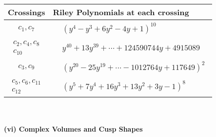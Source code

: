 \documentclass[1p]{elsarticle_modified}
\theoremstyle{definition}
\begin{document}
\begin{tabular}{m{50pt}|m{274pt}}
Crossings & \hspace{64pt}Riley Polynomials at each crossing \\
\hline $$\begin{aligned}c_{1},c_{7}\end{aligned}$$&$\begin{aligned}
&(y^4- y^3+6 y^2-4 y+1)^{10}
\end{aligned}$\\
\hline $$\begin{aligned}c_{2},c_{4},c_{8}\\c_{10}\end{aligned}$$&$\begin{aligned}
&y^{40}+13 y^{39}+\cdots+124590744 y+4915089
\end{aligned}$\\
\hline $$\begin{aligned}c_{3},c_{9}\end{aligned}$$&$\begin{aligned}
&(y^{20}-25 y^{19}+\cdots-1012764 y+117649)^{2}
\end{aligned}$\\
\hline $$\begin{aligned}c_{5},c_{6},c_{11}\\c_{12}\end{aligned}$$&$\begin{aligned}
&(y^5+7 y^4+16 y^3+13 y^2+3 y-1)^8
\end{aligned}$\\
\hline
\end{tabular}\\~\\
\newpage\flushleft \textbf{(vi) Complex Volumes and Cusp Shapes}
\end{document}
